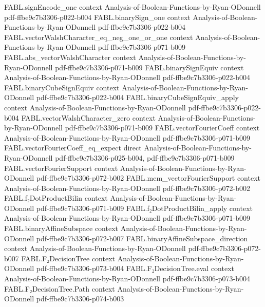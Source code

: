 \begin{theorem}
  {FABL.signEncode_one}
  {context}
  {Analysis-of-Boolean-Functions-by-Ryan-ODonnell}
  {pdf-ffbe9c7b3306-p022-b004}
\proofstep
  {FABL.binarySign_one}
  {context}
  {Analysis-of-Boolean-Functions-by-Ryan-ODonnell}
  {pdf-ffbe9c7b3306-p022-b004}
\proofstep
  {FABL.vectorWalshCharacter_eq_neg_one_or_one}
  {context}
  {Analysis-of-Boolean-Functions-by-Ryan-ODonnell}
  {pdf-ffbe9c7b3306-p071-b009}
\proofstep
  {FABL.abs_vectorWalshCharacter}
  {context}
  {Analysis-of-Boolean-Functions-by-Ryan-ODonnell}
  {pdf-ffbe9c7b3306-p071-b009}
\proofstep
  {FABL.binarySignEquiv}
  {context}
  {Analysis-of-Boolean-Functions-by-Ryan-ODonnell}
  {pdf-ffbe9c7b3306-p022-b004}
\proofstep
  {FABL.binaryCubeSignEquiv}
  {context}
  {Analysis-of-Boolean-Functions-by-Ryan-ODonnell}
  {pdf-ffbe9c7b3306-p022-b004}
\proofstep
  {FABL.binaryCubeSignEquiv_apply}
  {context}
  {Analysis-of-Boolean-Functions-by-Ryan-ODonnell}
  {pdf-ffbe9c7b3306-p022-b004}
\proofstep
  {FABL.vectorWalshCharacter_zero}
  {context}
  {Analysis-of-Boolean-Functions-by-Ryan-ODonnell}
  {pdf-ffbe9c7b3306-p071-b009}
\proofstep
  {FABL.vectorFourierCoeff}
  {context}
  {Analysis-of-Boolean-Functions-by-Ryan-ODonnell}
  {pdf-ffbe9c7b3306-p071-b009}
\proofstep
  {FABL.vectorFourierCoeff_eq_expect}
  {direct}
  {Analysis-of-Boolean-Functions-by-Ryan-ODonnell}
  {pdf-ffbe9c7b3306-p025-b004,
    pdf-ffbe9c7b3306-p071-b009}
\proofstep
  {FABL.vectorFourierSupport}
  {context}
  {Analysis-of-Boolean-Functions-by-Ryan-ODonnell}
  {pdf-ffbe9c7b3306-p072-b002}
\proofstep
  {FABL.mem_vectorFourierSupport}
  {context}
  {Analysis-of-Boolean-Functions-by-Ryan-ODonnell}
  {pdf-ffbe9c7b3306-p072-b002}
\proofstep
  {FABL.f₂DotProductBilin}
  {context}
  {Analysis-of-Boolean-Functions-by-Ryan-ODonnell}
  {pdf-ffbe9c7b3306-p071-b009}
\proofstep
  {FABL.f₂DotProductBilin_apply}
  {context}
  {Analysis-of-Boolean-Functions-by-Ryan-ODonnell}
  {pdf-ffbe9c7b3306-p071-b009}
\proofstep
  {FABL.binaryAffineSubspace}
  {context}
  {Analysis-of-Boolean-Functions-by-Ryan-ODonnell}
  {pdf-ffbe9c7b3306-p072-b007}
\proofstep
  {FABL.binaryAffineSubspace_direction}
  {context}
  {Analysis-of-Boolean-Functions-by-Ryan-ODonnell}
  {pdf-ffbe9c7b3306-p072-b007}
\proofstep
  {FABL.F₂DecisionTree}
  {context}
  {Analysis-of-Boolean-Functions-by-Ryan-ODonnell}
  {pdf-ffbe9c7b3306-p073-b004}
\proofstep
  {FABL.F₂DecisionTree.eval}
  {context}
  {Analysis-of-Boolean-Functions-by-Ryan-ODonnell}
  {pdf-ffbe9c7b3306-p073-b004}
\proofstep
  {FABL.F₂DecisionTree.Path}
  {context}
  {Analysis-of-Boolean-Functions-by-Ryan-ODonnell}
  {pdf-ffbe9c7b3306-p074-b003}

\end{theorem}
